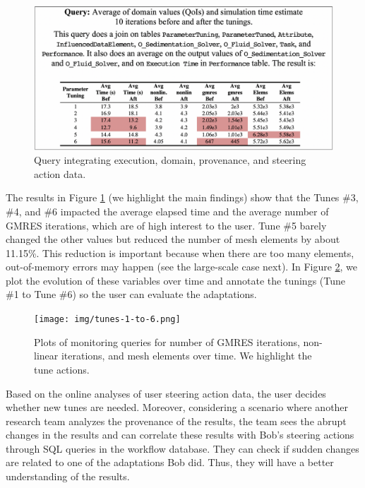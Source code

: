 \begin{figure}[H]
    \centering
    \includegraphics[width=\textwidth,keepaspectratio]{img/param_tun_q2.pdf}
    \caption{Query integrating execution, domain, provenance, and steering action data.}
    \label{fig:q2steering}
\end{figure}

The results in Figure \ref{fig:q2steering} (we highlight the main findings)
show that the Tunes \#3, \#4, and \#6 impacted the average elapsed time
and the average number of GMRES iterations, which are of high interest
to the user. Tune \#5 barely changed the other values but reduced the
number of mesh elements by about 11.15\%. This reduction is important
because when there are too many elements, out-of-memory errors may
happen (see the large-scale case next). In Figure \ref{fig:sixtunings}, we plot the evolution of
these variables over time and annotate the tunings (Tune \#1 to Tune
\#6) so the user can evaluate the adaptations.


\begin{figure}
    \centering
    \texttt{[image: img/tunes-1-to-6.png]}
    \caption{Plots of monitoring queries for number of GMRES iterations, non-linear iterations, and mesh elements over time. We highlight the tune actions.}
    \label{fig:sixtunings}
\end{figure}


Based on the online analyses of user steering action data, the user
 decides whether new tunes are needed. Moreover, considering a scenario where another research team
analyzes the provenance of the results, the team sees the abrupt changes in
the results and can correlate these results with Bob's steering actions
through SQL queries in the workflow database. They can check if sudden
changes are related to one of the adaptations Bob did. Thus, they will
have a better understanding of the results.

